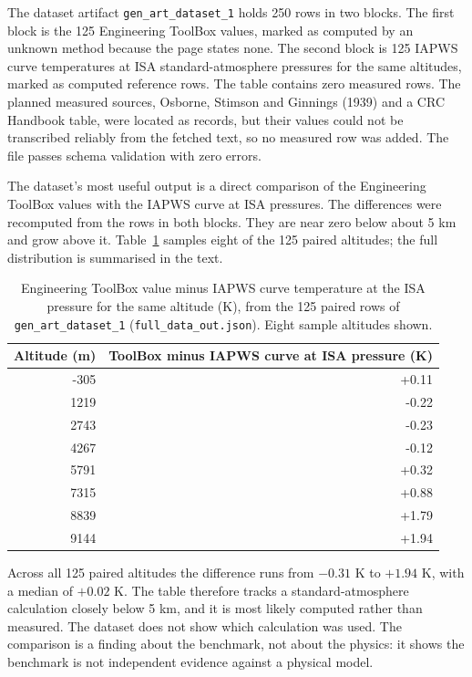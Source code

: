 \documentclass[11pt,letterpaper]{article}
\begin{document}
The dataset artifact \texttt{gen\_art\_dataset\_1} holds 250 rows in two blocks. The first block is the 125 Engineering ToolBox values, marked as computed by an unknown method because the page states none. The second block is 125 IAPWS curve temperatures at ISA standard-atmosphere pressures for the same altitudes, marked as computed reference rows. The table contains zero measured rows. The planned measured sources, Osborne, Stimson and Ginnings (1939) and a CRC Handbook table, were located as records, but their values could not be transcribed reliably from the fetched text, so no measured row was added. The file passes schema validation with zero errors.

The dataset's most useful output is a direct comparison of the Engineering ToolBox values with the IAPWS curve at ISA pressures. The differences were recomputed from the rows in both blocks. They are near zero below about 5 km and grow above it. Table~\ref{tab:tb_iapws_sample} samples eight of the 125 paired altitudes; the full distribution is summarised in the text.

\begin{table}[!htbp]
\centering\small
\caption{Engineering ToolBox value minus IAPWS curve temperature at the ISA pressure for the same altitude (K), from the 125 paired rows of \texttt{gen\_art\_dataset\_1} (\texttt{full\_data\_out.json}). Eight sample altitudes shown.}\label{tab:tb_iapws_sample}
\begin{tabular}{rr}
\toprule
Altitude (m) & ToolBox minus IAPWS curve at ISA pressure (K) \\
\midrule
-305 & +0.11 \\
1219 & -0.22 \\
2743 & -0.23 \\
4267 & -0.12 \\
5791 & +0.32 \\
7315 & +0.88 \\
8839 & +1.79 \\
9144 & +1.94 \\
\bottomrule
\end{tabular}
\end{table}

Across all 125 paired altitudes the difference runs from $-0.31$ K to $+1.94$ K, with a median of $+0.02$ K. The table therefore tracks a standard-atmosphere calculation closely below 5 km, and it is most likely computed rather than measured. The dataset does not show which calculation was used. The comparison is a finding about the benchmark, not about the physics: it shows the benchmark is not independent evidence against a physical model.
\end{document}
